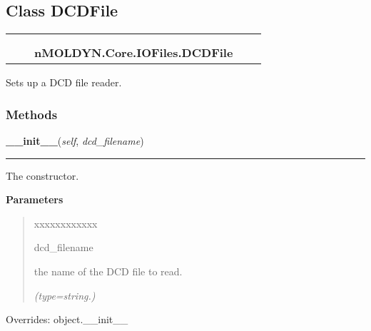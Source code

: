\subsection{Class DCDFile}

    \label{nMOLDYN:Core:IOFiles:DCDFile}
\begin{tabular}{cccccc}
\multicolumn{2}{r}{\settowidth{\BCL}{object}\multirow{2}{\BCL}{object}}
&&
  \\\cline{3-3}
  &&\multicolumn{1}{c|}{}
&&
  \\
&&\multicolumn{2}{l}{\textbf{nMOLDYN.Core.IOFiles.DCDFile}}
\end{tabular}

Sets up a DCD file reader.



  \subsubsection{Methods}

    \vspace{0.5ex}

\hspace{.8\funcindent}\begin{boxedminipage}{\funcwidth}

    \raggedright \textbf{\_\_init\_\_}(\textit{self}, \textit{dcd\_filename})

    \vspace{-1.5ex}

    \rule{\textwidth}{0.5\fboxrule}
\setlength{\parskip}{2ex}
    The constructor.

\setlength{\parskip}{1ex}
      \textbf{Parameters}
      \vspace{-1ex}

      \begin{quote}
        \begin{Ventry}{xxxxxxxxxxxx}

          \item[dcd\_filename]

          the name of the DCD file to read.

            {\it (type=string.)}

        \end{Ventry}

      \end{quote}

      Overrides: object.\_\_init\_\_

    \end{boxedminipage}

